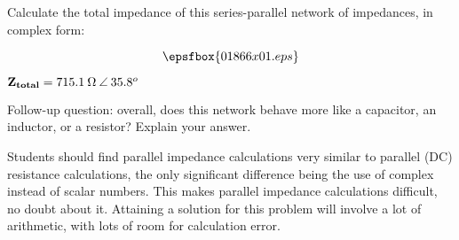 

Calculate the total impedance of this series-parallel network of impedances, in complex form:

$$\epsfbox{01866x01.eps}$$







${\bf Z_{total}} = 715.1 \> \Omega \> \angle \> 35.8^o$

\vskip 10pt

Follow-up question: overall, does this network behave more like a capacitor, an inductor, or a resistor?  Explain your answer.







Students should find parallel impedance calculations very similar to parallel (DC) resistance calculations, the only significant difference being the use of complex instead of scalar numbers.  This makes parallel impedance calculations difficult, no doubt about it.  Attaining a solution for this problem will involve a lot of arithmetic, with lots of room for calculation error.




